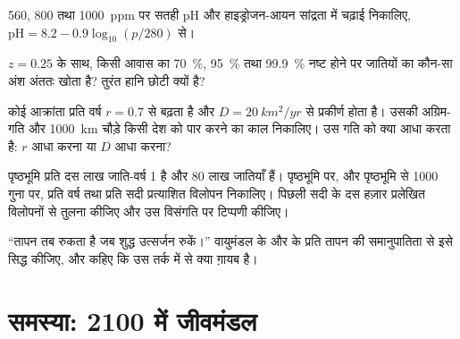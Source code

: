 \begin{exercise}[$\star\star$]\label{exo:b2:global-change:8}
560, 800 तथा \qty{1000}{ppm} पर सतही pH और हाइड्रोजन-आयन
सांद्रता में चढ़ाई निकालिए, $\mathrm{pH} = 8.2 -
0.9\log_{10}(p/280)$ से।
\end{exercise}

\begin{exercise}[$\star\star$]\label{exo:b2:global-change:9}
$z = 0.25$ के साथ, किसी आवास का \qty{70}{\%}, \qty{95}{\%} तथा
\qty{99.9}{\%} नष्ट होने पर जातियों का कौन-सा अंश अंततः खोता है?
तुरंत हानि छोटी क्यों है?
\end{exercise}

\begin{exercise}[$\star\star\star$]\label{exo:b2:global-change:10}
कोई आक्रांता प्रति वर्ष $r = 0.7$ से बढ़ता है और $D =
\qty{20}{km^2/yr}$ से प्रकीर्ण होता है। उसकी अग्रिम-गति और \qty{1000}{km}
चौड़े किसी देश को पार करने का काल निकालिए। उस गति को क्या आधा करता है: $r$ आधा करना
या $D$ आधा करना?
\end{exercise}

\begin{exercise}[$\star\star\star$]\label{exo:b2:global-change:11}
पृष्ठभूमि  प्रति दस लाख जाति-वर्ष 1 है और
80 लाख जातियाँ हैं। पृष्ठभूमि पर, और पृष्ठभूमि से 1000 गुना पर, प्रति
वर्ष तथा प्रति सदी प्रत्याशित विलोपन निकालिए।
पिछली सदी के दस हज़ार प्रलेखित विलोपनों से तुलना कीजिए और उस विसंगति
पर टिप्पणी कीजिए।
\end{exercise}

\begin{exercise}[$\star\star\star$]\label{exo:b2:global-change:12}
``तापन तब रुकता है जब शुद्ध उत्सर्जन रुकें।'' वायुमंडल के
 और  के प्रति तापन की समानुपातिता से
इसे सिद्ध कीजिए, और कहिए कि उस तर्क में से क्या ग़ायब है।
\end{exercise}

\section{समस्या: 2100 में जीवमंडल}


